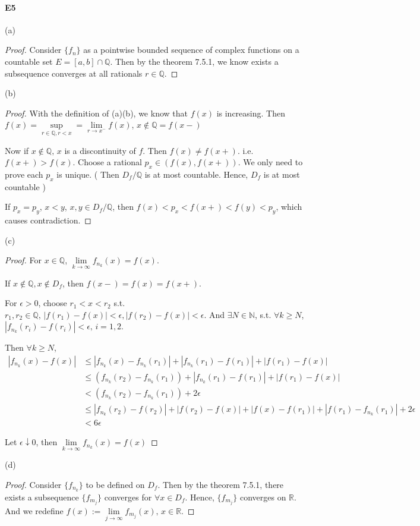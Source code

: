 \documentclass{article}
\begin{document}
\paragraph{E5}
(a)\begin{proof}
    Consider  $ \{f_n \} $ as  a pointwise bounded sequence of complex functions on a countable set  $ E=[a,b]\cap \mathbb{Q} $.
    Then by the theorem 7.5.1, we know exists a subsequence converges at all rationals  $ r\in\mathbb{Q  } $. 
\end{proof}
(b)\begin{proof}
    With the definition of (a)(b), we know that  $ f(x) $ is increasing. Then  $ f(x)=\sup\limits_{r\in\mathbb{Q },r<x }=\lim\limits_{r\to x^-}f(x)   $, $ x\not\in\mathbb{Q} =f(x-)$  

    Now if  $ x\not\in\mathbb{Q},\,x $ is a discontinuity of  $ f  $. Then  $ f(x)\not=f(x+) $. i.e.  $ f(x+)>f(x) $.
    Choose a rational $ p_x\in(f(x),f(x+ )) $. We only need to prove each  $ p_x $ is unique. ( Then  $ D_f/\mathbb{Q} $ is at most countable. Hence,  $ D_f $ is at most countable  )
    
    If  $ p_x=p_y $,  $ x<y $, $ x,y\in D_f/\mathbb{Q } $, then  $ f(x)<p_x<f(x+)<f(y)<p_y $, which causes contradiction.
\end{proof}
(c)\begin{proof}
    For  $ x\in \mathbb{Q} $,  $ \lim\limits_{k\to\infty}f_{n_k}(x)=f(x)   $.
    
    If  $ x\not\in\mathbb{Q},x\not\in D_f $, then $ f(x-)=f(x)=f(x+) $.

    For  $ \epsilon>0 $, choose  $ r_1<x<r_2 $  s.t. $ r_1,r_2\in\mathbb{Q},\,|f(r_1)-f(x)|<\epsilon,|f(r_2)-f(x)|<\epsilon $.
    And  $ \exists N\in \mathbb{N } $, s.t.  $ \forall k\geqslant N $,  $ |f_{n_k}(r_i)-f(r_i)|<\epsilon ,\,i=1,2$.
    
    Then  $ \forall k\geqslant N  $,  
    \begin{align*}
        |f_{n_k}(x)-f(x)|& \leqslant|f_{n_k}(x)-f_{n_k}(r_1)|+|f_{n_k}(r_1)- f(r_1)|+|f(r_1)-f(x)|\\
        & \leqslant (f_{n_k}(r_2)-f_{n_k}(r_1))+|f_{n_k}(r_1)- f(r_1)|+|f(r_1)-f(x)|\\
        &<(f_{n_k}(r_2)-f_{n_k}(r_1))+2\epsilon\\
        & \leqslant |f_{n_k}(r_2)-f(r_2)|+|f(r_2)-f(x)|+|f(x)-f(r_1)|+|f(r_1)-f_{n_k}(r_1)|+2\epsilon\\
        &<6\epsilon
    \end{align*} 

    Let  $ \epsilon\downarrow0 $, then  $ \lim\limits_{k\to\infty}f_{n_k}(x)=f(x)   $   
\end{proof}
(d)\begin{proof}
    Consider  $ \{f_{n_k}\} $ to be defined on  $ D_f $. Then by the theorem 7.5.1, there exists a subsequence  $ \{f_{m_j}\} $ converges for  $ \forall x\in D_f $. Hence,  $ \{f_{m_j}\} $ converges on  $ \mathbb{R } $.
    And we redefine   $ f(x):=\lim\limits_{j\to\infty}f_{m_j}(x),\,x\in\mathbb{R }   $.    
\end{proof}
\end{document}
